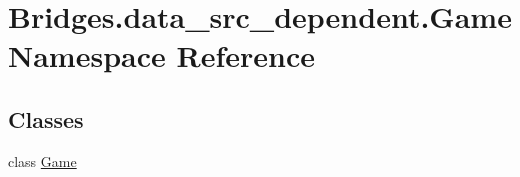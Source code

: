 \hypertarget{namespace_bridges_1_1data__src__dependent_1_1_game}{}\section{Bridges.\+data\+\_\+src\+\_\+dependent.\+Game Namespace Reference}
\label{namespace_bridges_1_1data__src__dependent_1_1_game}
\subsection*{Classes}
\begin{DoxyCompactItemize}
\item 
class \hyperlink{class_bridges_1_1data__src__dependent_1_1_game_1_1_game}{Game}
\end{DoxyCompactItemize}
